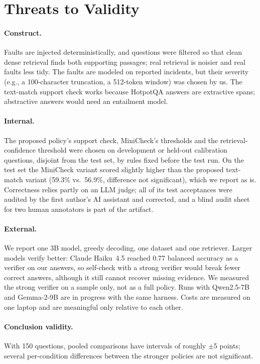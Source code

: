 \section{Threats to Validity}\label{sec:threats}

\paragraph{Construct.} Faults are injected deterministically, and questions were filtered so that
clean dense retrieval finds both supporting passages; real retrieval is noisier and real faults
less tidy. The faults are modeled on reported incidents, but their severity (e.g., a 100-character
truncation, a 512-token window) was chosen by us. The text-match support check works because
HotpotQA answers are extractive spans; abstractive answers would need an entailment model.

\paragraph{Internal.} The proposed policy's support check, MiniCheck's thresholds and the
retrieval-confidence threshold were chosen on development or held-out calibration questions,
disjoint from the test set, by rules fixed before the test run. On the test set the MiniCheck
variant scored slightly higher than the proposed text-match variant (59.3\% vs.\ 56.9\%, difference
not significant), which we report as is. Correctness relies partly on an LLM judge; all of its test
acceptances were audited by the first author's AI assistant and corrected, and a blind audit sheet
for two human annotators is part of the artifact.

\paragraph{External.} We report one 3B model, greedy decoding, one dataset and one retriever.
Larger models verify better: Claude Haiku~4.5 reached 0.77 balanced accuracy as a verifier on our
answers, so self-check with a strong verifier would break fewer correct answers, although it still
cannot recover missing evidence. We measured the strong verifier on a sample only, not as a full
policy. Runs with Qwen2.5-7B and Gemma-2-9B are in progress with the same harness. Costs are measured on one laptop
and are meaningful only relative to each other.

\paragraph{Conclusion validity.} With 150 questions, pooled comparisons have intervals of roughly
$\pm$5 points; several per-condition differences between the stronger policies are not significant.

